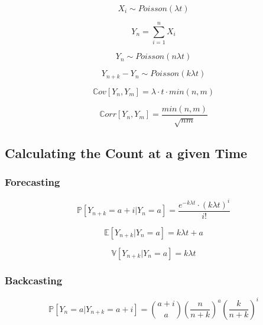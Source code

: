 \begin{equation}
    X_i \sim Poisson(\lambda t)
\end{equation}

\begin{equation}
    Y_n = \sum_{i = 1}^{n} X_i
\end{equation}

\begin{equation}
    Y_n \sim Poisson(n \lambda t)
\end{equation}

\begin{equation}
    Y_{n+k} - Y_n \sim Poisson(k \lambda t)
\end{equation}

\begin{equation}
    \mathbb{C}ov[Y_n, Y_m] = \lambda \cdot t \cdot min(n, m)
\end{equation}

\begin{equation}
    \mathbb{C}orr[Y_n, Y_m] = \frac{min(n, m)}{\sqrt{nm}}
\end{equation}

\subsection{Calculating the Count at a given Time}
\subsubsection{Forecasting}
\begin{equation}
    \mathbb{P}[Y_{n + k} = a + i | Y_n = a] =
    \frac{
        e^{-k \lambda t} \cdot (k \lambda t)^i
    }{ i! }
\end{equation}

\begin{equation}
    \mathbb{E}[Y_{n + k} | Y_n = a] = k \lambda t + a
\end{equation}

\begin{equation}
    \mathbb{V}[Y_{n + k} | Y_n = a] = k \lambda t
\end{equation}

\subsubsection{Backcasting}
\begin{equation}
    \mathbb{P}[Y_n = a | Y_{n + k} = a + i ] =
    \binom{a + i}{a} 
    \left(\frac{n}{n + k}\right)^a 
    \left(\frac{k}{n + k}\right)^i
\end{equation}

